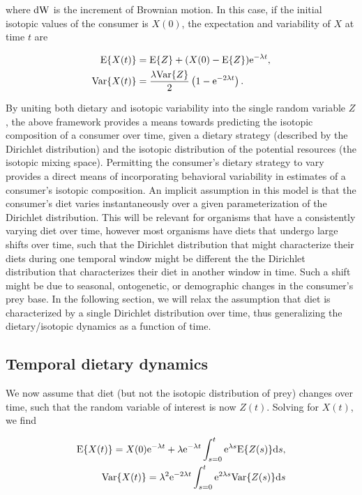 \documentclass[11pt]{article}
\begin{document}
\noindent where ${\rm dW}$ is the increment of Brownian motion.
In this case, if the initial isotopic values of the consumer is $X(0)$, the expectation and variability of $X$ at time $t$ are

\begin{align}
{\rm E}\{X(t)\} &= {\rm E}\{Z\} + (X(0) - {\rm E}\{Z\}){\rm e}^{-\lambda t}, \nonumber \\
{\rm Var}\{X(t)\} &= \frac{\lambda {\rm Var}\{Z\}}{2}\left(1 - {\rm e}^{-2\lambda t}\right).
\end{align}

By uniting both dietary and isotopic variability into the single random variable $Z$, the above framework provides a means towards predicting the isotopic composition of a consumer over time, given a dietary strategy (described by the Dirichlet distribution) and the isotopic distribution of the potential resources (the isotopic mixing space).
Permitting the consumer's dietary strategy to vary provides a direct means of incorporating behavioral variability in estimates of a consumer's isotopic composition.
An implicit assumption in this model is that the consumer's diet varies instantaneously over a given parameterization of the Dirichlet distribution.
This will be relevant for organisms that have a consistently varying diet over time, however most organisms have diets that undergo large shifts over time, such that the Dirichlet distribution that might characterize their diets during one temporal window might be different the the Dirichlet distribution that characterizes their diet in another window in time.
Such a shift might be due to seasonal, ontogenetic, or demographic changes in the consumer's prey base.
In the following section, we will relax the assumption that diet is characterized by a single Dirichlet distribution over time, thus generalizing the dietary/isotopic dynamics as a function of time.

\subsection{Temporal dietary dynamics}
We now assume that diet (but not the isotopic distribution of prey) changes over time, such that the random variable of interest is now $Z(t)$.
Solving for $X(t)$, we find

\begin{align}
{\rm E}\{X(t)\} = X(0){\rm e}^{-\lambda t} + \lambda{\rm e}^{-\lambda t} \int_{s=0}^t {\rm e}^{\lambda s} {\rm E}\{Z(s)\}{\rm d}s, \nonumber \\
{\rm Var}\{X(t)\} = \lambda^2 {\rm e}^{-2\lambda t} \int_{s=0}^t {\rm e}^{2\lambda s} {\rm Var}\{Z(s)\} {\rm d}s
\end{align}
\end{document}
